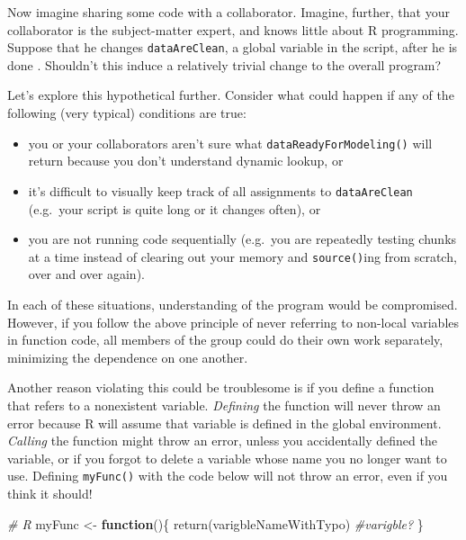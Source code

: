 \documentclass[
  12pt,
]{krantz}
\makeatletter
\newenvironment{Shaded}{\begin{snugshade}}{\end{snugshade}}
\newcommand{\CommentTok}[1]{\textcolor[rgb]{0.37,0.37,0.37}{\textit{#1}}}
\newcommand{\ControlFlowTok}[1]{\textcolor[rgb]{0.27,0.27,0.27}{\textbf{#1}}}
\newcommand{\FunctionTok}[1]{\textcolor[rgb]{0,0,0}{#1}}
\newcommand{\NormalTok}[1]{#1}
\newcommand{\OtherTok}[1]{\textcolor[rgb]{0.37,0.37,0.37}{#1}}
\providecommand{\tightlist}{%
  \setlength{\itemsep}{0pt}\setlength{\parskip}{0pt}}
\newenvironment{kframe}{%
\medskip{}
\setlength{\fboxsep}{.8em}
 \def\at@end@of@kframe{}%
 \ifinner\ifhmode%
  \def\at@end@of@kframe{\end{minipage}}%
  \begin{minipage}{\columnwidth}%
 \fi\fi%
 \def\FrameCommand##1{\hskip\@totalleftmargin \hskip-\fboxsep
 \colorbox{shadecolor}{##1}\hskip-\fboxsep
     \hskip-\linewidth \hskip-\@totalleftmargin \hskip\columnwidth}%
 \MakeFramed {\advance\hsize-\width
   \@totalleftmargin\z@ \linewidth\hsize
   \@setminipage}}%
 {\par\unskip\endMakeFramed%
 \at@end@of@kframe}
\renewenvironment{Shaded}{\begin{kframe}}{\end{kframe}}
\makeatother
\begin{document}
Now imagine sharing some code with a collaborator. Imagine, further, that your collaborator is the subject-matter expert, and knows little about R programming. Suppose that he changes \texttt{dataAreClean}, a global variable in the script, after he is done . Shouldn't this induce a relatively trivial change to the overall program?

Let's explore this hypothetical further. Consider what could happen if any of the following (very typical) conditions are true:

\begin{itemize}
\tightlist
\item
  you or your collaborators aren't sure what \texttt{dataReadyForModeling()} will return because you don't understand dynamic lookup, or
\item
  it's difficult to visually keep track of all assignments to \texttt{dataAreClean} (e.g.~your script is quite long or it changes often), or
\item
  you are not running code sequentially (e.g.~you are repeatedly testing chunks at a time instead of clearing out your memory and \texttt{source()}ing from scratch, over and over again).
\end{itemize}

In each of these situations, understanding of the program would be compromised. However, if you follow the above principle of never referring to non-local variables in function code, all members of the group could do their own work separately, minimizing the dependence on one another.

Another reason violating this could be troublesome is if you define a function that refers to a nonexistent variable. \emph{Defining} the function will never throw an error because R will assume that variable is defined in the global environment. \emph{Calling} the function might throw an error, unless you accidentally defined the variable, or if you forgot to delete a variable whose name you no longer want to use. Defining \texttt{myFunc()} with the code below will not throw an error, even if you think it should!

\begin{Shaded}
\begin{Highlighting}[]
\CommentTok{\# R}
\NormalTok{myFunc }\OtherTok{\textless{}{-}} \ControlFlowTok{function}\NormalTok{()\{}
  \FunctionTok{return}\NormalTok{(varigbleNameWithTypo) }\CommentTok{\#varigble?}
\NormalTok{\}}
\end{Highlighting}
\end{Shaded}
\end{document}
